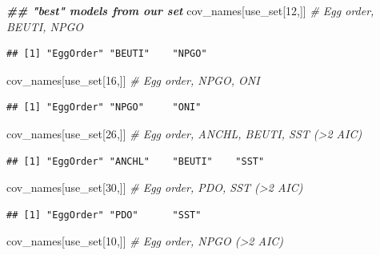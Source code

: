 \documentclass[
]{article}
\newenvironment{Shaded}{\begin{snugshade}}{\end{snugshade}}
\newcommand{\CommentTok}[1]{\textcolor[rgb]{0.56,0.35,0.01}{\textit{#1}}}
\newcommand{\DecValTok}[1]{\textcolor[rgb]{0.00,0.00,0.81}{#1}}
\newcommand{\DocumentationTok}[1]{\textcolor[rgb]{0.56,0.35,0.01}{\textbf{\textit{#1}}}}
\newcommand{\NormalTok}[1]{#1}
\begin{document}
\begin{Shaded}
\begin{Highlighting}[]
\DocumentationTok{\#\# "best" models from our set}
\NormalTok{cov\_names[use\_set[}\DecValTok{12}\NormalTok{,]] }\CommentTok{\# Egg order, BEUTI, NPGO}
\end{Highlighting}
\end{Shaded}

\begin{verbatim}
## [1] "EggOrder" "BEUTI"    "NPGO"
\end{verbatim}

\begin{Shaded}
\begin{Highlighting}[]
\NormalTok{cov\_names[use\_set[}\DecValTok{16}\NormalTok{,]] }\CommentTok{\# Egg order, NPGO, ONI}
\end{Highlighting}
\end{Shaded}

\begin{verbatim}
## [1] "EggOrder" "NPGO"     "ONI"
\end{verbatim}

\begin{Shaded}
\begin{Highlighting}[]
\NormalTok{cov\_names[use\_set[}\DecValTok{26}\NormalTok{,]] }\CommentTok{\# Egg order, ANCHL, BEUTI, SST (\textgreater{}2 AIC)}
\end{Highlighting}
\end{Shaded}

\begin{verbatim}
## [1] "EggOrder" "ANCHL"    "BEUTI"    "SST"
\end{verbatim}

\begin{Shaded}
\begin{Highlighting}[]
\NormalTok{cov\_names[use\_set[}\DecValTok{30}\NormalTok{,]] }\CommentTok{\# Egg order, PDO, SST (\textgreater{}2 AIC)}
\end{Highlighting}
\end{Shaded}

\begin{verbatim}
## [1] "EggOrder" "PDO"      "SST"
\end{verbatim}

\begin{Shaded}
\begin{Highlighting}[]
\NormalTok{cov\_names[use\_set[}\DecValTok{10}\NormalTok{,]] }\CommentTok{\# Egg order, NPGO (\textgreater{}2 AIC)}
\end{Highlighting}
\end{Shaded}
\end{document}
